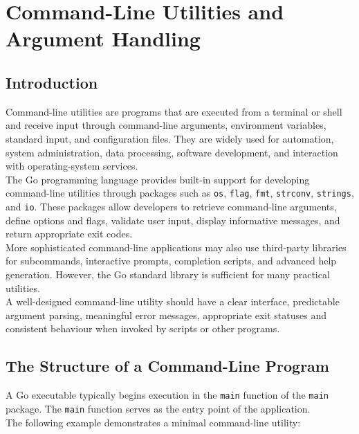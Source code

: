 \section{Command-Line Utilities and Argument Handling}

\subsection{Introduction}

Command-line utilities are programs that are executed from a terminal or shell and receive input through command-line arguments, environment variables, standard input, and configuration files. They are widely used for automation, system administration, data processing, software development, and interaction with operating-system services.\\

The Go programming language provides built-in support for developing command-line utilities through packages such as \texttt{os}, \texttt{flag}, \texttt{fmt}, \texttt{strconv}, \texttt{strings}, and \texttt{io}. These packages allow developers to retrieve command-line arguments, define options and flags, validate user input, display informative messages, and return appropriate exit codes.\\

More sophisticated command-line applications may also use third-party libraries for subcommands, interactive prompts, completion scripts, and advanced help generation. However, the Go standard library is sufficient for many practical utilities.\\

A well-designed command-line utility should have a clear interface, predictable argument parsing, meaningful error messages, appropriate exit statuses and consistent behaviour when invoked by scripts or other programs.\\

\subsection{The Structure of a Command-Line Program}

A Go executable typically begins execution in the \texttt{main} function of the \texttt{main} package. The \texttt{main} function serves as the entry point of the application.\\

The following example demonstrates a minimal command-line utility:


